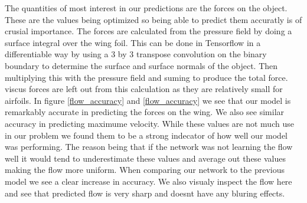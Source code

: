 \documentclass{article} %
\begin{document}
The quantities of most interest in our predictions are the forces on the object. These are the values being optimized so being able to predict them accuratly is of crusial importance. The forces are calculated from the pressure field by doing a surface integral over the wing foil. This can be done in Tensorflow in a differentiable way by using a 3 by 3 transpose convolution on the binary boundary to determine the surface and surface normals of the object. Then multiplying this with the pressure field and suming to produce the total force. viscus forces are left out from this calculation as they are relatively small for airfoils. In figure \ref{flow_accuracy} and \ref{flow_accuracy} we see that our model is remarkably accurate in predicting the forces on the wing. We also see similar accuracy in predicting maximume velocity. While these values are not much use in our problem we found them to be a strong indecator of how well our model was performing. The reason being that if the network was not learning the flow well it would tend to underestimate these values and average out these values making the flow more uniform. When comparing our network to the previous model we see a clear increase in accuracy. We also visualy inspect the flow here and see that predicted flow is very sharp and doesnt have any bluring effects.
\end{document}
